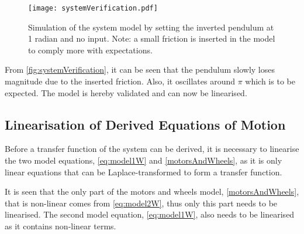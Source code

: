 \begin{figure}[H]
\centering
\texttt{[image: systemVerification.pdf]}
\caption{Simulation of the system model by setting the inverted pendulum at 1 radian and no input. Note: a small friction is inserted in the model to comply more with expectations.}
\label{fig:systemVerification}
\end{figure}

From \autoref{fig:systemVerification}, it can be seen that the pendulum slowly loses magnitude due to the inserted friction. Also, it oscillates around $\pi$ which is to be expected. The model is hereby validated and can now be linearised.


\subsection{Linearisation of Derived Equations of Motion\label{subsec:Linearization}}
Before a transfer function of the system can be derived, it is necessary to linearise the two model equations, \autoref{eq:model1W} and \ref{motorsAndWheels}, as it is only linear equations that can be Laplace-transformed to form a transfer function.

It is seen that the only part of the motors and wheels model, \autoref{motorsAndWheels}, that is non-linear comes from \autoref{eq:model2W}, thus only this part needs to be linearised.
The second model equation, \autoref{eq:model1W}, also needs to be linearised as it contains non-linear terms. 

